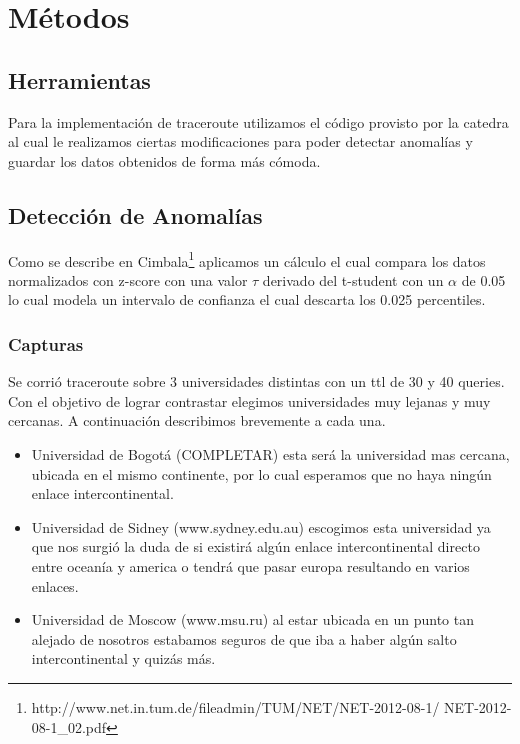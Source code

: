 \section{Métodos}

\subsection*{Herramientas}
Para la implementación de traceroute utilizamos el código provisto por la catedra al cual le realizamos ciertas modificaciones para poder detectar anomalías y guardar los datos obtenidos de forma más cómoda.

\subsection*{Detección de Anomalías}

Como se describe en Cimbala\footnote{http://www.net.in.tum.de/fileadmin/TUM/NET/NET-2012-08-1/
NET-2012-08-1\_02.pdf} aplicamos un cálculo el cual compara los datos normalizados con z-score con una valor $\tau$ derivado del t-student con un $\alpha$ de 0.05 lo cual modela un intervalo de confianza el cual descarta los 0.025 percentiles.


\subsubsection*{Capturas}
Se corrió traceroute sobre 3 universidades distintas con un ttl de 30 y 40 queries. Con el objetivo de lograr contrastar elegimos universidades muy lejanas y muy cercanas. A continuación describimos brevemente a cada una.

\begin{itemize}
	\item Universidad de Bogotá (COMPLETAR) esta será la universidad mas cercana, ubicada en el mismo continente, por lo cual esperamos que no haya ningún enlace intercontinental.
	\item Universidad de Sidney (www.sydney.edu.au) escogimos esta universidad ya que nos surgió la duda de si existirá algún enlace intercontinental directo entre oceanía y america o tendrá que pasar europa resultando en varios enlaces.
	\item Universidad de Moscow (www.msu.ru) al estar ubicada en un punto tan alejado de nosotros estabamos seguros de que iba a haber algún salto intercontinental y quizás más.
\end{itemize}